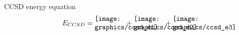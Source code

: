 \begin{frame}{CCSD energy equation }
    \begin{equation*}
    E_{CCSD} = 
    \parbox{15mm}{\texttt{[image: graphics/ccsd\_e1]}}
    + \parbox{15mm}{\texttt{[image: graphics/ccsd\_e2]}}
    + \parbox{15mm}{\texttt{[image: graphics/ccsd\_e3]}}
\end{equation*}



\end{frame}

    
